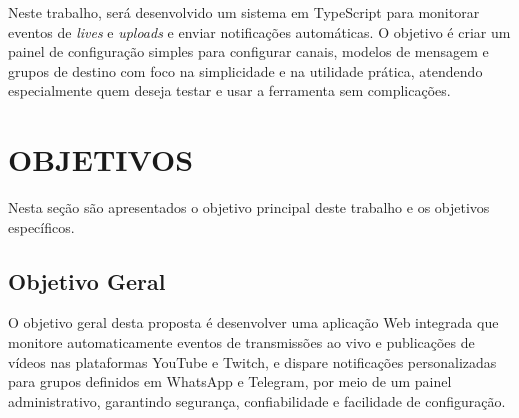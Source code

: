 Neste trabalho, será desenvolvido um sistema em TypeScript para monitorar eventos de \textit{lives} e \textit{uploads} e enviar notificações automáticas. O objetivo é criar um painel de configuração simples para configurar canais, modelos de mensagem e grupos de destino com foco na simplicidade e na utilidade prática, atendendo especialmente quem deseja testar e usar a ferramenta sem complicações.

\section{OBJETIVOS}
\label{sec:objetivos}

Nesta seção são apresentados o objetivo principal deste trabalho e os objetivos específicos.

\subsection{Objetivo Geral}
\label{subsec:objgeral}









O objetivo geral desta proposta é desenvolver uma aplicação Web integrada que monitore automaticamente eventos de transmissões ao vivo e publicações de vídeos nas plataformas YouTube e Twitch, e dispare notificações personalizadas para grupos definidos em WhatsApp e Telegram, por meio de um painel administrativo, garantindo segurança, confiabilidade e facilidade de configuração.

